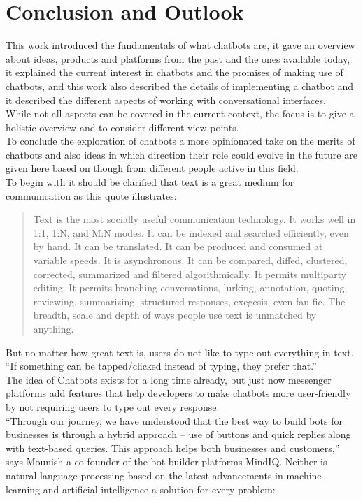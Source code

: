 \chapter{Conclusion and Outlook}

This work introduced the fundamentals of what chatbots are,
it gave an overview about ideas, products and platforms from the past and the ones available today,
it explained the current interest in chatbots and the promises of making use of chatbots,
and this work also described the details of implementing a chatbot and it described the different aspects of working with conversational interfaces.
\\

While not all aspects can be covered in the current context,
the focus is to give a holistic overview and to consider different view points.
\\

To conclude the exploration of chatbots a more opinionated take on the merits of chatbots
and also ideas in which direction their role could evolve in the future are given here
based on though from different people active in this field.
\\

To begin with it should be clarified that text is a great medium for communication as this quote\cite{futuretext} illustrates:

\begin{quote}
Text is the most socially useful communication technology. It works well in 1:1, 1:N, and M:N modes. It can be indexed and searched efficiently, even by hand. It can be translated. It can be produced and consumed at variable speeds. It is asynchronous. It can be compared, diffed, clustered, corrected, summarized and filtered algorithmically. It permits multiparty editing. It permits branching conversations, lurking, annotation, quoting, reviewing, summarizing, structured responses, exegesis, even fan fic. The breadth, scale and depth of ways people use text is unmatched by anything.
\end{quote}

But no matter how great text is, users do not like to type out everything in text.
``If something can be tapped/clicked instead of typing, they prefer that.''\cite{chatbotslife}
\\
The idea of Chatbots exists for a long time already,
but just now messenger platforms add features that help developers to make chatbots more user-friendly by not requiring users to type out every response.
\\
``Through our journey, we have understood that the best way to build bots for businesses is through a hybrid approach – use of buttons and quick replies along with text-based queries. This approach helps both businesses and customers,'' says Mounish a co-founder of the bot builder platforms MindIQ\cite{techinasia}.
Neither is natural language processing based on the latest advancements in machine learning and artificial intelligence a solution for every problem\cite{neednlp}:

